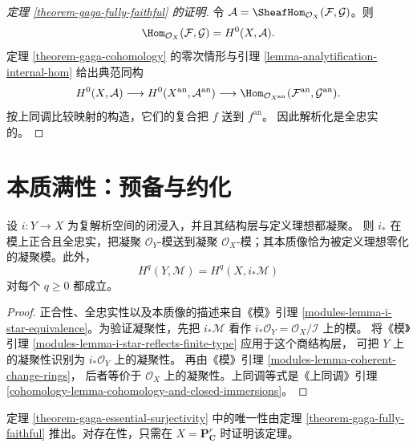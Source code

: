 \begin{proof}[定理 \ref{theorem-gaga-fully-faithful} 的证明]
令 $\mathcal A=\SheafHom_{\mathcal O_X}(\mathcal F,\mathcal G)$。则
$$
\Hom_{\mathcal O_X}(\mathcal F,\mathcal G)
=H^0(X,\mathcal A).
$$
定理 \ref{theorem-gaga-cohomology} 的零次情形与引理
\ref{lemma-analytification-internal-hom} 给出典范同构
$$
H^0(X,\mathcal A)
\longrightarrow H^0(X^{\mathrm{an}},\mathcal A^{\mathrm{an}})
\longrightarrow
\Hom_{\mathcal O_{X^{\mathrm{an}}}}
(\mathcal F^{\mathrm{an}},\mathcal G^{\mathrm{an}}).
$$
按上同调比较映射的构造，它们的复合把 $f$ 送到 $f^{\mathrm{an}}$。
因此解析化是全忠实的。
\end{proof}

\section{本质满性：预备与约化}
\label{section-gaga-essential-surjectivity-preliminaries}

\begin{lemma}
\label{lemma-coherent-analytic-closed-immersion}
设 $i:Y\to X$ 为复解析空间的闭浸入，并且其结构层与定义理想都凝聚。
则 $i_*$ 在模上正合且全忠实，把凝聚 $\mathcal O_Y$-模送到凝聚
$\mathcal O_X$-模；其本质像恰为被定义理想零化的凝聚模。此外，
$$
H^q(Y,\mathcal M)=H^q(X,i_*\mathcal M)
$$
对每个 $q\geq0$ 都成立。
\end{lemma}

\begin{proof}
正合性、全忠实性以及本质像的描述来自《模》引理
\ref{modules-lemma-i-star-equivalence}。为验证凝聚性，先把
$i_*\mathcal M$ 看作 $i_*\mathcal O_Y=\mathcal O_X/\mathcal I$ 上的模。
将《模》引理 \ref{modules-lemma-i-star-reflects-finite-type} 应用于这个商结构层，
可把 $Y$ 上的凝聚性识别为 $i_*\mathcal O_Y$ 上的凝聚性。
再由《模》引理 \ref{modules-lemma-coherent-change-rings}，
后者等价于 $\mathcal O_X$ 上的凝聚性。上同调等式是《上同调》引理
\ref{cohomology-lemma-cohomology-and-closed-immersions}。
\end{proof}

\begin{lemma}
\label{lemma-gaga-essential-surjectivity-projective-reduction}
定理 \ref{theorem-gaga-essential-surjectivity} 中的唯一性由定理
\ref{theorem-gaga-fully-faithful} 推出。对存在性，只需在
$X=\mathbf P^r_{\mathbf C}$ 时证明该定理。
\end{lemma}

